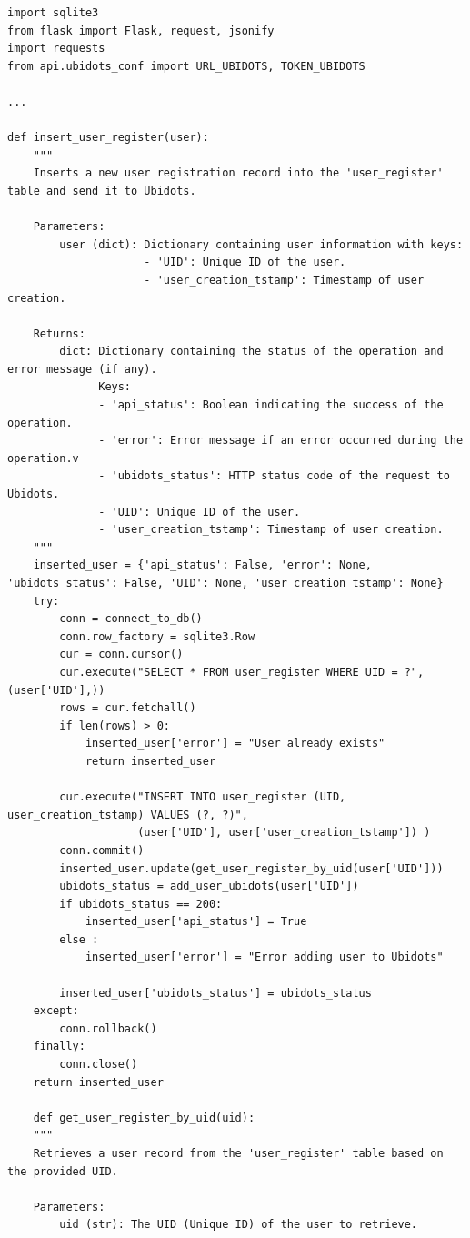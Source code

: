 \documentclass{article}
\begin{document}
\begin{lstlisting}
import sqlite3
from flask import Flask, request, jsonify
import requests
from api.ubidots_conf import URL_UBIDOTS, TOKEN_UBIDOTS

...

def insert_user_register(user):
    """
    Inserts a new user registration record into the 'user_register' table and send it to Ubidots.

    Parameters:
        user (dict): Dictionary containing user information with keys:
                     - 'UID': Unique ID of the user.
                     - 'user_creation_tstamp': Timestamp of user creation.

    Returns:
        dict: Dictionary containing the status of the operation and error message (if any).
              Keys:
              - 'api_status': Boolean indicating the success of the operation.
              - 'error': Error message if an error occurred during the operation.v
              - 'ubidots_status': HTTP status code of the request to Ubidots.
              - 'UID': Unique ID of the user.
              - 'user_creation_tstamp': Timestamp of user creation.
    """
    inserted_user = {'api_status': False, 'error': None, 'ubidots_status': False, 'UID': None, 'user_creation_tstamp': None}
    try:
        conn = connect_to_db()
        conn.row_factory = sqlite3.Row
        cur = conn.cursor()
        cur.execute("SELECT * FROM user_register WHERE UID = ?", (user['UID'],))
        rows = cur.fetchall()
        if len(rows) > 0:
            inserted_user['error'] = "User already exists"
            return inserted_user
        
        cur.execute("INSERT INTO user_register (UID, user_creation_tstamp) VALUES (?, ?)",
                    (user['UID'], user['user_creation_tstamp']) )
        conn.commit()
        inserted_user.update(get_user_register_by_uid(user['UID']))
        ubidots_status = add_user_ubidots(user['UID'])
        if ubidots_status == 200:
            inserted_user['api_status'] = True
        else :
            inserted_user['error'] = "Error adding user to Ubidots"
            
        inserted_user['ubidots_status'] = ubidots_status
    except:
        conn.rollback()
    finally:
        conn.close()
    return inserted_user

	def get_user_register_by_uid(uid):
    """
    Retrieves a user record from the 'user_register' table based on the provided UID.

    Parameters:
        uid (str): The UID (Unique ID) of the user to retrieve.


\end{lstlisting}
\end{document}
